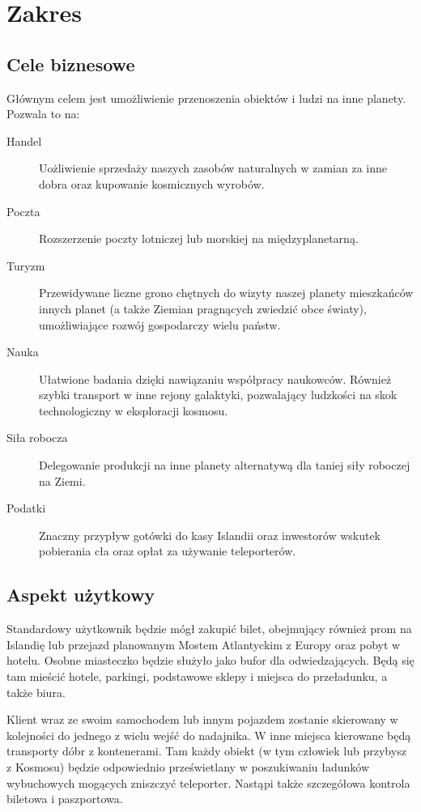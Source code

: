 \section{Zakres} 
\subsection{Cele biznesowe}
Głównym celem jest umożliwienie przenoszenia obiektów i ludzi na inne planety.
Pozwala to na:
\begin{description}
\item[Handel] Uożliwienie sprzedaży naszych zasobów naturalnych w zamian za inne dobra oraz kupowanie kosmicznych wyrobów.
\item[Poczta] Rozszerzenie poczty lotniczej lub morskiej na międzyplanetarną.
\item[Turyzm] Przewidywane liczne grono chętnych do wizyty naszej planety mieszkańców innych planet (a także Ziemian pragnących zwiedzić obce światy), umożliwiające rozwój gospodarczy wielu państw.
\item[Nauka] Ułatwione badania dzięki nawiązaniu współpracy naukowców. Również szybki transport w inne rejony galaktyki, pozwalający ludzkości na skok technologiczny w eksploracji kosmosu.
\item[Siła robocza] Delegowanie produkcji na inne planety alternatywą dla taniej siły roboczej na Ziemi.
\item[Podatki] Znaczny przypływ gotówki do kasy Islandii oraz inwestorów wskutek pobierania cła oraz opłat za używanie teleporterów.
\end{description}

\subsection{Aspekt użytkowy}
Standardowy użytkownik będzie mógł zakupić bilet, obejmujący również prom na Islandię lub przejazd planowanym Mostem Atlantyckim z Europy oraz pobyt w hotelu.
Osobne miasteczko będzie służyło jako bufor dla odwiedzających.
Będą się tam mieścić hotele, parkingi, podstawowe sklepy i miejsca do przeładunku, a także biura.

Klient wraz ze swoim samochodem lub innym pojazdem zostanie skierowany w kolejności do jednego z wielu wejść do nadajnika.
W inne miejsca kierowane będą transporty dóbr z kontenerami.
Tam każdy obiekt (w tym człowiek lub przybysz z Kosmosu) będzie odpowiednio prześwietlany w poszukiwaniu ładunków wybuchowych mogących zniszczyć teleporter.
Nastąpi także szczegółowa kontrola biletowa i paszportowa.

